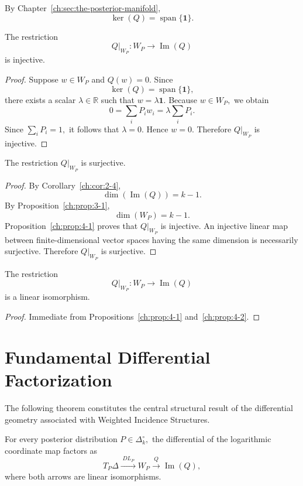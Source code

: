 By Chapter~\ref{ch:sec:the-posterior-manifold},
\[
\ker(Q)
=
\operatorname{span}\{\mathbf1\}.
\]
\begin{proposition}
\label{ch:prop:4-1}
The restriction
\[
Q|_{W_P}
:
W_P
\longrightarrow
\operatorname{Im}(Q)
\]
is injective.
\end{proposition}
\begin{proof}
Suppose
$w\in W_P$
and
$Q(w)=0.$
Since
\[
\ker(Q)
=
\operatorname{span}\{\mathbf1\},
\]
there exists a scalar
$\lambda\in\mathbb R$
such that
$w=\lambda\mathbf1.$
Because
$w\in W_P,$
we obtain
\[
0
=
\sum_i P_iw_i
=
\lambda\sum_iP_i.
\]
Since
$\sum_iP_i=1,$
it follows that
$\lambda=0.$
Hence
$w=0.$
Therefore
$Q|_{W_P}$
is injective. 
\end{proof}
\begin{proposition}
\label{ch:prop:4-2}
The restriction
$Q|_{W_P}$
is surjective.
\end{proposition}
\begin{proof}
By Corollary~\ref{ch:cor:2-4},
\[
\dim(\operatorname{Im}(Q))
=
k-1.
\]
By Proposition~\ref{ch:prop:3-1},
\[
\dim(W_P)
=
k-1.
\]
Proposition~\ref{ch:prop:4-1} proves that
$Q|_{W_P}$
is injective.
An injective linear map between finite-dimensional vector spaces having the same dimension is necessarily surjective.
Therefore
$Q|_{W_P}$
is surjective. 
\end{proof}
\begin{corollary}
\label{ch:cor:4-3}
The restriction
\[
Q|_{W_P}
:
W_P
\longrightarrow
\operatorname{Im}(Q)
\]
is a linear isomorphism.
\end{corollary}
\begin{proof}
Immediate from Propositions~\ref{ch:prop:4-1} and~\ref{ch:prop:4-2}. 
\end{proof}
\section{Fundamental Differential Factorization}\label{ch:sec:fundamental-differential-factorisation}
The following theorem constitutes the central structural result of the differential geometry associated with Weighted Incidence Structures.
\begin{theorem}
\label{ch:thm:4-4}
For every posterior distribution
$P\in\Delta_k^\circ,$
the differential of the logarithmic coordinate map factors as
\[
T_P\Delta
\xrightarrow{\;DL_P\;}
W_P
\xrightarrow{\;Q\;}
\operatorname{Im}(Q),
\]
where both arrows are linear isomorphisms.
\end{theorem}

